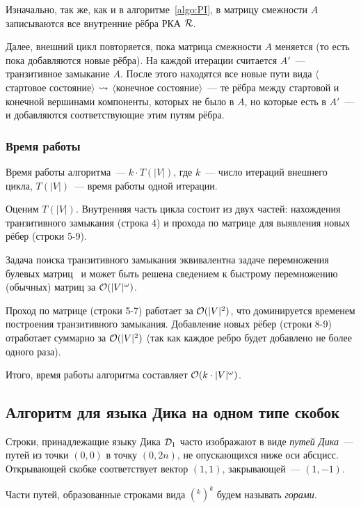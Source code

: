 Изначально, так же, как и в алгоритме~\ref{algo:PI}, в матрицу смежности $A$ записываются все внутренние рёбра РКА $\mathcal{R}$.

Далее, внешний цикл повторяется, пока матрица смежности $A$ меняется (то есть пока добавляются новые рёбра). На каждой итерации считается $A'$~--- транзитивное замыкание $A$. После этого находятся все новые пути вида $\langle$стартовое состояние$\rangle$ $\rightsquigarrow$ $\langle$конечное состояние$\rangle$~--- те рёбра между стартовой и конечной вершинами компоненты, которых не было в $A$, но которые есть в $A'$~--- и добавляются соответствующие этим путям рёбра.

\subsubsection*{Время работы}

Время работы алгоритма~--- $k \cdot T(|V|)$, где $k$~--- число итераций внешнего цикла, $T(|V|)$~--- время работы одной итерации. 

Оценим $T(|V|)$. Внутренняя часть цикла состоит из двух частей: нахождения транзитивного замыкания (строка 4) и прохода по матрице для выявления новых рёбер (строки 5-9). 

Задача поиска транзитивного замыкания эквивалентна задаче перемножения булевых матриц~\cite{Aho1974} и может быть решена сведением к быстрому перемножению (обычных) матриц за $\mathcal{O}(|V|^\omega)$.

Проход по матрице (строки 5-7) работает за $\mathcal{O}(|V|^2)$, что доминируется временем построения транзитивного замыкания. Добавление новых рёбер (строки 8-9) отработает суммарно за $\mathcal{O}(|V|^2)$ (так как каждое ребро будет добавлено не более одного раза).

Итого, время работы алгоритма составляет $\mathcal{O}(k \cdot |V|^{\omega})$.

\subsection{Алгоритм для языка Дика на одном типе скобок}

\begin{definition}\label{def:dyck_paths}
  Строки, принадлежащие языку Дика $\mathcal{D}_1$ часто изображают в виде \textit{путей Дика}~--- путей из точки $(0, 0)$ в точку $(0, 2n)$, не опускающихся ниже оси абсцисс. Открывающей скобке соответствует вектор $(1, 1)$, закрывающей~--- $(1, -1)$.

  Части путей, образованные строками вида $(^k )^k$ будем называть \textit{горами}.

\end{definition}


